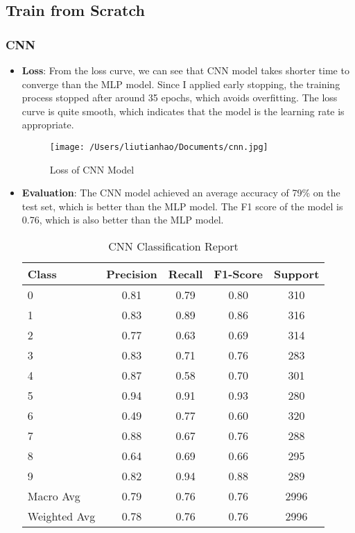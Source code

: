 \documentclass{article}
\begin{document}
\subsection{Train from Scratch}
\subsubsection{CNN}
\begin{itemize}
  \item \textbf{Loss}: From the loss curve, we can see that CNN model takes shorter time to converge than the MLP model. 
  Since I applied early stopping, the training process stopped after around 35 epochs, which avoids overfitting.
  The loss curve is quite smooth, which indicates that the model is the learning rate is appropriate.
  \begin{figure}[h]
    \centering
    \texttt{[image: /Users/liutianhao/Documents/cnn.jpg]}
    \caption{Loss of CNN Model}
  \end{figure}
  \item \textbf{Evaluation}: 
  The CNN model achieved an average accuracy of 79\% on the test set, which is better than the MLP model.
  The F1 score of the model is 0.76, which is also better than the MLP model.
  \begin{table}[h]
    \centering
    \caption{CNN Classification Report}
    \label{tab:classification_report}
    \begin{tabular}{lcccc}
        \toprule
        Class & Precision & Recall & F1-Score & Support \\
        \midrule
        0 & 0.81 & 0.79 & 0.80 & 310 \\
        1 & 0.83 & 0.89 & 0.86 & 316 \\
        2 & 0.77 & 0.63 & 0.69 & 314 \\
        3 & 0.83 & 0.71 & 0.76 & 283 \\
        4 & 0.87 & 0.58 & 0.70 & 301 \\
        5 & 0.94 & 0.91 & 0.93 & 280 \\
        6 & 0.49 & 0.77 & 0.60 & 320 \\
        7 & 0.88 & 0.67 & 0.76 & 288 \\
        8 & 0.64 & 0.69 & 0.66 & 295 \\
        9 & 0.82 & 0.94 & 0.88 & 289 \\
        \midrule
        Macro Avg & 0.79 & 0.76 & 0.76 & 2996 \\
        Weighted Avg & 0.78 & 0.76 & 0.76 & 2996 \\
        \bottomrule
    \end{tabular}
\end{table}
\end{itemize}
\end{document}
